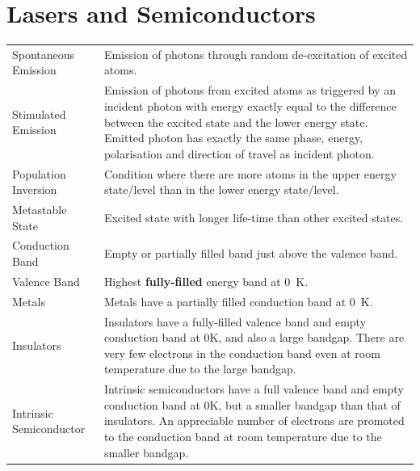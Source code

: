 \documentclass[a4paper,11pt]{article}
\begin{document}
	\section{Lasers and Semiconductors}
	\begin{center}
		\renewcommand{\arraystretch}{1.2}
		\begin{tabular}{@{} l p{10cm} @{}}
			\toprule
			Spontaneous Emission & Emission of photons through random de-excitation of excited atoms.\\
			Stimulated Emission & Emission of photons from excited atoms as triggered by an incident photon with energy exactly equal to the difference between the excited state and the lower energy state. Emitted photon has exactly the same phase, energy, polarisation and direction of travel as incident photon.\\
			Population Inversion & Condition where there are more atoms in the upper energy state/level than in the lower energy state/level.\\
			Metastable State & Excited state with longer life-time than other excited states.\\
			Conduction Band & Empty or partially filled band just above the valence band.\\
			Valence Band & Highest \textbf{fully-filled} energy band at \SI{0}{\kelvin}.\\
			Metals & Metals have a partially filled conduction band at \SI{0}{\kelvin}.\\
			Insulators & Insulators have a fully-filled valence band and empty conduction band at 0K, and also a large bandgap. There are very few electrons in the conduction band even at room temperature due to the large bandgap.\\
			Intrinsic Semiconductor & Intrinsic semiconductors have a full valence band and empty conduction band at 0K, but a smaller bandgap than that of insulators. An appreciable number of electrons are promoted to the conduction band at room temperature due to the smaller bandgap.\\
			\bottomrule
		\end{tabular}
	\end{center}
\end{document}
